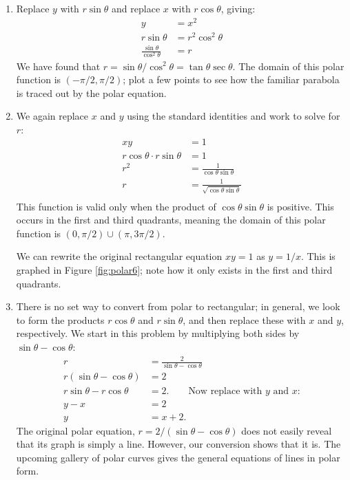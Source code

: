 {\begin{enumerate}
	\item Replace $y$ with $r\sin\theta$ and replace $x$ with $r\cos\theta$, giving:
	\begin{align*}
	y &=x^2\\
	r\sin\theta &= r^2\cos^2\theta\\
	\frac{\sin\theta}{\cos^2\theta} &= r
	\end{align*}
	We have found that $r=\sin\theta/\cos^2\theta = \tan\theta\sec\theta$. The domain of this polar function is $(-\pi/2,\pi/2)$; plot a few points to see how the familiar parabola is traced out by the polar equation.
	
	\item		We again replace $x$ and $y$ using the standard identities and work to solve for $r$:
	\begin{align*}
	xy &= 1 \\
	r\cos\theta\cdot r\sin\theta & = 1\\
	r^2 & = \frac{1}{\cos\theta\sin\theta}\\
	r & = \frac{1}{\sqrt{\cos\theta\sin\theta}}\\
	\end{align*}
	This function is valid only when the product of $\cos\theta\sin\theta$ is positive. This occurs in the first and third quadrants, meaning the domain of this polar function is $(0,\pi/2) \cup (\pi,3\pi/2)$.
	
	We can rewrite the original rectangular equation $xy=1$ as $y=1/x$. This is graphed in Figure \ref{fig:polar6}; note how it only exists in the first and third quadrants.
		
	\item		There is no set way to convert from polar to rectangular; in general, we look to form the products $r\cos \theta$ and $r\sin\theta$, and then replace these with $x$ and $y$, respectively. We start in this problem by multiplying both sides by $\sin\theta-\cos\theta$:
	\begin{align*}
	r &= \frac{2}{\sin\theta-\cos\theta} \\
	r(\sin\theta-\cos\theta) &= 2\\
	r\sin\theta-r\cos\theta &= 2. \qquad \text{Now replace with $y$ and $x$:}\\
	y-x &= 2\\
	y &= x+2.
	\end{align*}
	The original polar equation, $r=2/(\sin\theta-\cos\theta)$ does not easily reveal that its graph is simply a line. However, our conversion shows that it is. The upcoming gallery of polar curves gives the general equations of lines in polar form.


\end{enumerate}}
